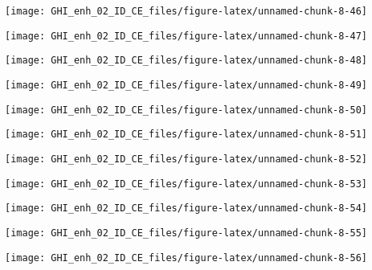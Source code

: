 \documentclass[
  10pt,
  a4paper,oneside]{article}
\begin{document}
\begin{center}\texttt{[image: GHI\_enh\_02\_ID\_CE\_files/figure-latex/unnamed-chunk-8-46]} \end{center}

\begin{center}\texttt{[image: GHI\_enh\_02\_ID\_CE\_files/figure-latex/unnamed-chunk-8-47]} \end{center}

\begin{center}\texttt{[image: GHI\_enh\_02\_ID\_CE\_files/figure-latex/unnamed-chunk-8-48]} \end{center}

\begin{center}\texttt{[image: GHI\_enh\_02\_ID\_CE\_files/figure-latex/unnamed-chunk-8-49]} \end{center}

\begin{center}\texttt{[image: GHI\_enh\_02\_ID\_CE\_files/figure-latex/unnamed-chunk-8-50]} \end{center}

\begin{center}\texttt{[image: GHI\_enh\_02\_ID\_CE\_files/figure-latex/unnamed-chunk-8-51]} \end{center}

\begin{center}\texttt{[image: GHI\_enh\_02\_ID\_CE\_files/figure-latex/unnamed-chunk-8-52]} \end{center}

\begin{center}\texttt{[image: GHI\_enh\_02\_ID\_CE\_files/figure-latex/unnamed-chunk-8-53]} \end{center}

\begin{center}\texttt{[image: GHI\_enh\_02\_ID\_CE\_files/figure-latex/unnamed-chunk-8-54]} \end{center}

\begin{center}\texttt{[image: GHI\_enh\_02\_ID\_CE\_files/figure-latex/unnamed-chunk-8-55]} \end{center}

\begin{center}\texttt{[image: GHI\_enh\_02\_ID\_CE\_files/figure-latex/unnamed-chunk-8-56]} \end{center}
\end{document}

